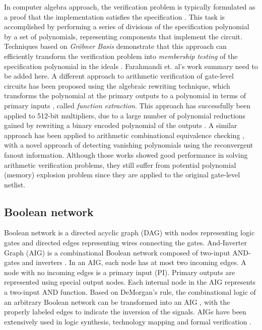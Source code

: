 In computer algebra approach, the verification problem is typically formulated as a proof that the implementation satisfies the specification \cite{ciesielski2015verification}\cite{kalla:tcad13}\cite{farahmandi2015groebner}\cite{STABLE:date11}\cite{sayedformal:date-2016}. This task is accomplished by performing a series of divisions of the specification polynomial by a set of polynomials, representing components that implement the circuit. Techniques based on \textit{Gr{\" o}bner Basis} demonstrate that this approach can efficiently transform the verification problem into \textit{membership testing} of the specification polynomial in the ideals \cite{kalla:tcad13}\cite{farahmandi2015groebner}. {\color{red} Farahmandi et. al's work summary need to be added here.} A different approach to arithmetic verification of gate-level circuits has been proposed using the algebraic rewriting technique, which transforms the polynomial at the primary outputs to a polynomial in terms of primary inputs \cite{ciesielski2015verification}, called \textit{function extraction}. This approach has successfully been applied to 512-bit multipliers, due to a large number of polynomial reductions gained by rewriting a binary encoded polynomial of the outputs \cite{yu:2016-tcad-verification}. A similar approach has been applied to arithmetic combinational equivalence checking \cite{sayedformal:date-2016}, {\color{red} with a novel approach of detecting vanishing polynomials using the reconvergent fanout information}. Although those works showed good performance in solving arithmetic verification problems, they still suffer from potential polynomial (memory) explosion problem since they are applied to the original gate-level netlist.


\subsection{Boolean network}
Boolean network is a directed acyclic graph (DAG) with nodes representing logic gates and directed edges representing wires connecting the gates. And-Inverter Graph (AIG) is a combinational Boolean network composed of two-input AND-gates and inverters \cite{mishchenko:2006-dag}. In an AIG, each node has at most two incoming edges. A node with no incoming edges is a primary input (PI). Primary outputs are represented using special output nodes. Each internal node in the AIG represents a two-input AND function. Based on DeMorgan's rule, the combinational logic of an arbitrary Boolean network can be transformed into an AIG \cite{abc-link}, with the properly labeled edges to indicate the inversion of the signals. AIGs have been extensively used in logic synthesis, technology mapping \cite{abc-link} and formal verification \cite{mishchenko2005fraigs-verify}.



